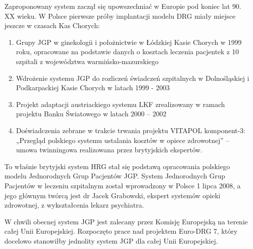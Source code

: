 Zaproponowany system zaczął się upowszechniać w Europie pod koniec lat 90. XX wieku. W Polsce pierwsze próby implantacji modelu DRG miały miejsce jeszcze w czasach Kas Chorych:
\begin{enumerate}
\item Grupy JGP w ginekologii i położnictwie w Łódzkiej Kasie Chorych w 1999 roku, opracowane na podstawie danych o kosztach leczenia pacjentek z 10 szpitali z województwa warmińsko-mazurskiego
\item Wdrożenie systemu JGP do rozliczeń świadczeń szpitalnych w Dolnośląskiej i Podkarpackiej Kasie Chorych w latach 1999 - 2003
\item Projekt adaptacji austriackiego systemu LKF zrealizowany w ramach projektu Banku Światowego w latach 2000 – 2002
\item Doświadczenia zebrane w trakcie trwania projektu VITAPOL komponent-3: „Przegląd polskiego systemu ustalania kosztów w opiece zdrowotnej” – umowa twinningowa realizowana przez brytyjskich ekspertów.
\end{enumerate} 
To właśnie brytyjski system HRG stał się podstawą opracowania polskiego modelu Jednorodnych Grup Pacjentów JGP. System Jednorodnych Grup Pacjentów w leczeniu szpitalnym został wprowadzony w Polsce 1 lipca 2008, a jego głównym twórcą jest dr Jacek Grabowski, ekspert systemów opieki zdrowotnej, z wykształcenia lekarz psychiatra.

W chwili obecnej system JGP jest zalecany przez Komisję Europejską na terenie całej Unii Europejskiej. Rozpoczęto prace nad projektem Euro-DRG 7, który docelowo stanowiłby jednolity system JGP dla całej Unii Europejskiej.

